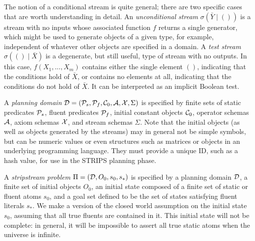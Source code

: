 \documentclass[letterpaper]{article} %
\theoremstyle{plain}\newtheorem{thm}{Theorem}
\theoremstyle{definition}\newtheorem{defn}{Definition}
\theoremstyle{plain}\newtheorem{lem}{Lemma}
\theoremstyle{plain}\newtheorem{cor}{Corollary}
\newcommand{\algname}{{\sc strips}tream}
\begin{document}
The notion of a conditional stream is quite general;  there are two
specific cases that are worth understanding in detail.
An {\em unconditional stream} $\sigma(\bar{Y} \mid ())$ is a stream
with no inputs whose associated function $f$ returns a single
generator, which might be used to generate objects of a given type,
for example, independent of whatever other objects are specified in a
domain.
A {\em test stream} $\sigma(() \mid \bar{X})$ is a degenerate, but
still useful, type of stream with no outputs.  In this case, 
$f(X_1, ..., X_m)$ contains either the single element $()$, indicating
that the  conditions hold of $\bar{X}$, or
contains no elements at all, indicating that the  conditions
do not hold of $\bar{X}$.  It can be interpreted as an implicit
Boolean test.


A {\em planning domain}
${\cal D} = ({\cal P}_s, {\cal P}_f, {\cal C}_0, {\cal A}, {\cal X},
\Sigma)$ is specified by finite sets of static predicates
${\cal P}_s$, fluent predicates ${\cal P}_f$, initial constant objects
${\cal C}_0$, operator schemas ${\cal A}$, axiom schemas ${\cal X}$, and
stream schemas $\Sigma$.  Note that the initial objects (as well as
objects generated by the streams) may in general not be simple
symbols, but can be numeric values or even structures such as matrices
or objects in an underlying programming language.  They must provide a
unique ID, such as a hash value, for use in the STRIPS planning phase.
 
A {\em \algname{} problem} $\Pi = ({\cal D}, O_0, s_0, s_*)$ is
specified by a planning domain ${\cal D}$, a finite set of initial objects
$O_0$, an initial state composed of a finite set of static or fluent
atoms $s_0$, and a goal set defined to be the set of states satisfying
fluent literals $s_*$.  
We make a version of the closed world assumption on the initial state
$s_0$, assuming that all true fluents 
are contained in it.  This
initial state will not be complete: in general, it will be impossible
to assert all true static atoms when the universe is infinite.
\end{document}

